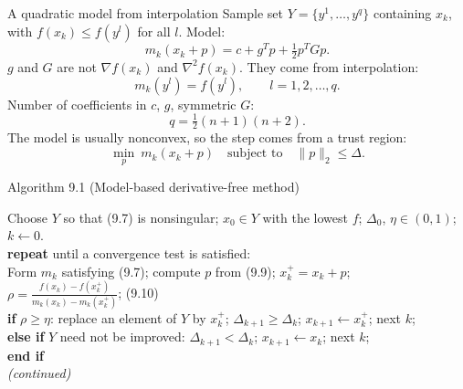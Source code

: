 \documentclass[12pt,aspectratio=169]{beamer}
\newcommand{\algblock}[1]{\begin{block}{}#1\end{block}}
\newcommand{\kw}[1]{\textbf{#1}}
\newcommand{\ind}{\hspace*{1.2em}}
\begin{document}
\begin{frame}{A quadratic model from interpolation}
  Sample set $Y=\{y^1,\dots,y^q\}$ containing $x_k$, with $f(x_k)\le f(y^l)$ for all $l$. Model:
  \begin{equation}
    m_k(x_k+p) = c + g^Tp + \tfrac12 p^TGp. \tag{9.6}
  \end{equation}
  $g$ and $G$ are \alert{not} $\nabla f(x_k)$ and $\nabla^2 f(x_k)$. They come from interpolation:
  \begin{equation}
    m_k(y^l) = f(y^l), \qquad l=1,2,\dots,q. \tag{9.7}
  \end{equation}
  Number of coefficients in $c$, $g$, symmetric $G$:
  \begin{equation}
    q = \tfrac12(n+1)(n+2). \tag{9.8}
  \end{equation}
  The model is usually nonconvex, so the step comes from a trust region:
  \begin{equation}
    \min_p\ m_k(x_k+p) \quad\text{subject to}\quad \|p\|_2\le\Delta. \tag{9.9}
  \end{equation}
\end{frame}

\begin{frame}{Algorithm 9.1 (Model-based derivative-free method)}
  \algblock{
    Choose $Y$ so that (9.7) is nonsingular; $x_0\in Y$ with the lowest $f$; $\Delta_0$, $\eta\in(0,1)$; $k\leftarrow0$.\\
    \kw{repeat} until a convergence test is satisfied:\\
    \ind Form $m_k$ satisfying (9.7); compute $p$ from (9.9); $x_k^+ = x_k+p$;\\
    \ind $\displaystyle\rho = \frac{f(x_k)-f(x_k^+)}{m_k(x_k)-m_k(x_k^+)}$; \hfill (9.10)\\
    \ind \kw{if} $\rho\ge\eta$: replace an element of $Y$ by $x_k^+$; $\Delta_{k+1}\ge\Delta_k$; $x_{k+1}\leftarrow x_k^+$; next $k$;\\
    \ind \kw{else if} $Y$ need not be improved: $\Delta_{k+1}<\Delta_k$; $x_{k+1}\leftarrow x_k$; next $k$;\\
    \ind \kw{end if}\\
    \ind \emph{(continued)}
  }
\end{frame}
\end{document}
